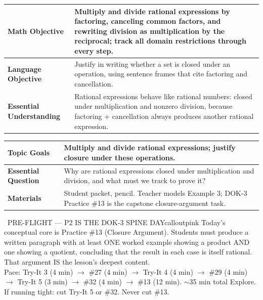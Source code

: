 \documentclass[11pt]{article}
\begin{document}

{\small
\renewcommand{\arraystretch}{1.25}
\noindent\begin{tabular}{|p{1.8in}|p{4.8in}|}
\hline
\textbf{Math Objective} & Multiply and divide rational expressions by factoring, canceling common factors, and rewriting division as multiplication by the reciprocal; track all domain restrictions through every step. \\ \hline
\textbf{Language Objective} & Justify in writing whether a set is closed under an operation, using sentence frames that cite factoring and cancellation. \\ \hline
\textbf{Essential Understanding} & Rational expressions behave like rational numbers: closed under multiplication and nonzero division, because factoring + cancellation always produces another rational expression. \\ \hline
\end{tabular}
}

{\small
\renewcommand{\arraystretch}{1.25}
\noindent\begin{tabular}{|p{1.8in}|p{4.8in}|}
\hline
\textbf{Topic Goals} & Multiply and divide rational expressions; justify closure under these operations. \\ \hline
\textbf{Essential Question} & Why are rational expressions closed under multiplication and division, and what must we track to prove it? \\ \hline
\textbf{Materials} & Student packet, pencil. Teacher models Example 3; DOK-3 Practice \#13 is the capstone closure-argument task. \\ \hline
\end{tabular}
}

\begin{callout}{\IconPin\ PRE-FLIGHT — P2 IS THE DOK-3 SPINE DAY}{calloutpink}
Today’s conceptual core is Practice \#13 (Closure Argument). Students must produce a written paragraph with at least ONE worked example showing a product AND one showing a quotient, concluding that the result in each case is itself rational. That argument IS the lesson’s deepest content.\\
Pace: Try-It 3 (4 min) \(\rightarrow\) \#27 (4 min) \(\rightarrow\) Try-It 4 (4 min) \(\rightarrow\) \#29 (4 min) \(\rightarrow\) Try-It 5 (3 min) \(\rightarrow\) \#32 (4 min) \(\rightarrow\) \#13 (12 min). \(\sim\)35 min total Explore.\\
If running tight: cut Try-It 5 or \#32. Never cut \#13.
\end{callout}
\end{document}
